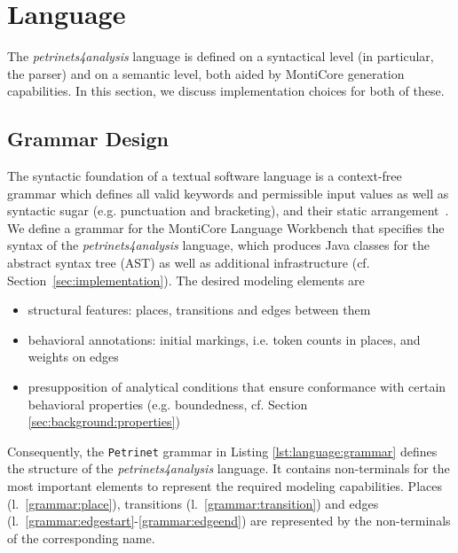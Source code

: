 
\section{Language}\label{sec:language}

The \emph{petrinets4analysis} language is defined on a syntactical level (in particular, the parser) and on a semantic level, both aided by MontiCore generation capabilities. In this section, we discuss implementation choices for both of these.

\subsection{Grammar Design}

The syntactic foundation of a textual software language is a context-free grammar which defines all valid keywords and permissible input values as well as syntactic sugar (e.g. punctuation and bracketing), and their static arrangement~\cite{rumpe2017monticore}. We define a grammar for the MontiCore Language Workbench that specifies the syntax of the \emph{petrinets4analysis} language, which produces Java classes for the abstract syntax tree (AST) as well as additional infrastructure (cf. Section~\ref{sec:implementation}). The desired modeling elements are

\begin{itemize}
    \item structural features: places, transitions and edges between them
    \item behavioral annotations: initial markings, i.e. token counts in places, and weights on edges
    \item presupposition of analytical conditions that ensure conformance with certain behavioral properties (e.g. boundedness, cf. Section \ref{sec:background:properties})
\end{itemize}

Consequently, the \texttt{Petrinet} grammar in Listing \ref{lst:language:grammar} defines the structure of the \emph{petrinets4analysis} language. It contains non-terminals for the most important elements to represent the required modeling capabilities. Places (l.~\ref{grammar:place}), transitions (l.~\ref{grammar:transition}) and edges (l.~\ref{grammar:edgestart}-\ref{grammar:edgeend}) are represented by the non-terminals of the corresponding name.

